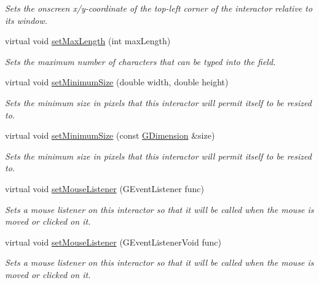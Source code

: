 \begin{DoxyCompactItemize}
\begin{DoxyCompactList}\small\item\em Sets the onscreen x/y-\/coordinate of the top-\/left corner of the interactor relative to its window. \end{DoxyCompactList}\item 
virtual void \mbox{\hyperlink{classGTextField_a077c24fa5337fbf431738f8ba513d19c}{set\+Max\+Length}} (int max\+Length)
\begin{DoxyCompactList}\small\item\em Sets the maximum number of characters that can be typed into the field. \end{DoxyCompactList}\item 
virtual void \mbox{\hyperlink{classGInteractor_a0cf428e207b7f22cc08138a90b1b87b2}{set\+Minimum\+Size}} (double width, double height)
\begin{DoxyCompactList}\small\item\em Sets the minimum size in pixels that this interactor will permit itself to be resized to. \end{DoxyCompactList}\item 
virtual void \mbox{\hyperlink{classGInteractor_a3b1046117ac6cb7abe467e00ba8a81f4}{set\+Minimum\+Size}} (const \mbox{\hyperlink{structGDimension}{G\+Dimension}} \&size)
\begin{DoxyCompactList}\small\item\em Sets the minimum size in pixels that this interactor will permit itself to be resized to. \end{DoxyCompactList}\item 
virtual void \mbox{\hyperlink{classGInteractor_a37d8dbc943f59920f705b0104f60bde2}{set\+Mouse\+Listener}} (G\+Event\+Listener func)
\begin{DoxyCompactList}\small\item\em Sets a mouse listener on this interactor so that it will be called when the mouse is moved or clicked on it. \end{DoxyCompactList}\item 
virtual void \mbox{\hyperlink{classGInteractor_aea7f647ea62d59f71b5fad6aa65eeaf9}{set\+Mouse\+Listener}} (G\+Event\+Listener\+Void func)
\begin{DoxyCompactList}\small\item\em Sets a mouse listener on this interactor so that it will be called when the mouse is moved or clicked on it. \end{DoxyCompactList}\item 

\end{DoxyCompactItemize}
